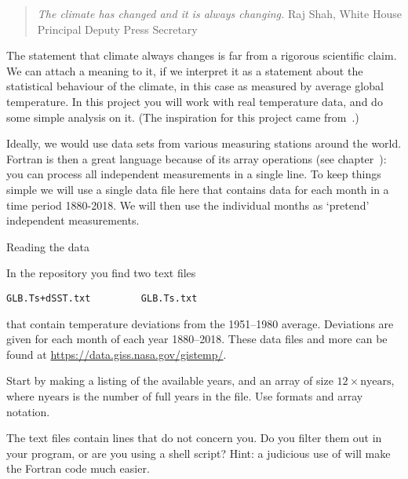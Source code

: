 
\begin{quotation}
  \noindent
  \textsl{The climate has changed and it is always changing.}
  \hfill\break\hbox{}\hfill Raj Shah, White House Principal Deputy Press Secretary\par
\end{quotation}

The statement that climate always changes is far from a rigorous
scientific claim.  We can attach a meaning to it, if we interpret it
as a statement about the statistical behaviour of the climate, in this
case as measured by average global temperature.  In this project you
will work with real temperature data, and do some simple analysis on
it. (The inspiration for this project came
from~\cite{ManRestrepo:climatechange}.)

Ideally, we would use data sets from various measuring stations around
the world. Fortran is then a great language because of its array
operations (see chapter~): you can process all
independent measurements in a single line. To keep things simple we
will use a single data file here that contains data for each month in
a time period 1880-2018. We will then use the individual months as
`pretend' independent measurements.

 {Reading the data}

In the repository you find two text files
\begin{verbatim}
GLB.Ts+dSST.txt         GLB.Ts.txt
\end{verbatim}
that contain temperature deviations from the 1951--1980 average.
Deviations are given for each month of each year 1880--2018. These
data files and more can be found at
\url{https://data.giss.nasa.gov/gistemp/}.

\begin{exercise}
  Start by making a listing of the available years, and an array
   of size $12\times\mathrm{nyears}$, where
  $\mathrm{nyears}$ is the number of full years in the file.
  Use formats and array notation.

  The text files contain lines that do not concern you. Do you filter
  them out in your program, or are you using a shell script? Hint: a
  judicious use of  will make the Fortran code much easier.
\end{exercise}

